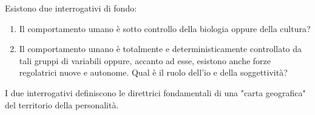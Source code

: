 \documentclass{subfiles}
\begin{document}
Esistono due interrogativi di fondo:
\begin{enumerate}
    \item Il comportamento umano è sotto controllo della biologia oppure della cultura?
    \item Il comportamento umano è totalmente e deterministicamente controllato da tali gruppi di variabili oppure,
          accanto ad esse, esistono anche forze regolatrici nuove e autonome. Qual è il ruolo dell'io e della soggettività?
\end{enumerate}

I due interrogativi definiscono le direttrici fondamentali di una "carta geografica" del territorio della personalità.
\end{document}
